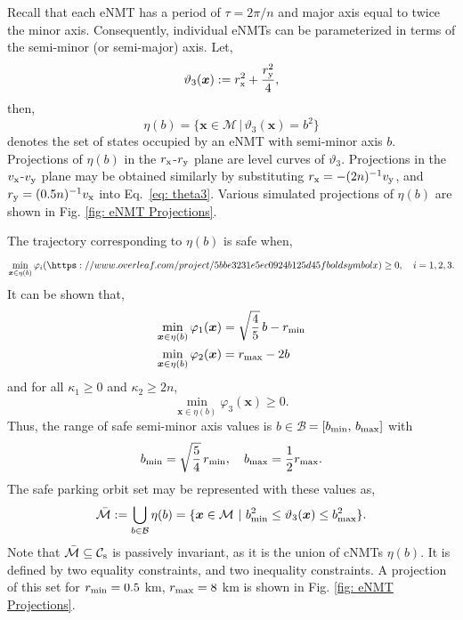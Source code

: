 \documentclass[twocolumn,letterpaper]{IEEEAerospaceCLS}  %
\theoremstyle{definition}
\begin{document}
Recall that each eNMT has a period of $\tau = 2\pi/n$ and major axis equal to twice the minor axis. 
Consequently, individual eNMTs can be parameterized in terms of the semi-minor (or semi-major) axis. 
Let, 
\begin{equation} \label{eq: theta3}
  \vartheta_3(\boldsymbol{x}) := r_{\rm x}^2 + \frac{r_{\rm y}^2}{4}, 
\end{equation}
then, 
\begin{equation}
\eta(b) = \{ \boldsymbol{x} \in {\mathcal{M}} \, | \,  \vartheta_3(\boldsymbol{x}) = b^2 \} 
\end{equation}
denotes the set of states occupied by an eNMT with semi-minor axis $b$.
Projections of $\eta(b)$ in the $r_{\rm x}$-$r_{\rm y}$ plane are level curves of $\vartheta_3$. Projections in the $v_{\rm x}$-$v_{\rm y}$ plane may be obtained similarly by substituting $r_{\rm x}=-(2n)^{-1} v_{\rm y}$, and $r_{\rm y}=(0.5n)^{-1} v_{\rm x}$ into Eq.~\eqref{eq: theta3}. 
Various simulated projections of $\eta(b)$ are shown in Fig. \ref{fig: eNMT Projections}. 

The trajectory corresponding to $\eta(b)$ is safe when, 
\begin{equation}
  \min_{\boldsymbol{x}\in\eta(b)} \varphi_i(\https://www.overleaf.com/project/5bbe3231e5ec0924b125d45fboldsymbol{x}) \geq 0, \quad i = 1,2,3. 
\end{equation}
It can be shown that, 
\begin{align}
  \min_{\boldsymbol{x}\in\eta(b)} \varphi_1(\boldsymbol{x}) &= \sqrt{\frac{4}{5}} \, b - r_{\rm min} \\ 
  \min_{\boldsymbol{x}\in\eta(b)} \varphi_2(\boldsymbol{x}) &= r_{\rm max} - 2 b \\
\end{align}
and for all $\kappa_1\geq0 $ and $\kappa_2 \geq 2n$,
\begin{equation}
   \min_{\boldsymbol{x}\in\eta(b)} \varphi_3(\boldsymbol{x}) \geq 0. 
\end{equation}
Thus, the range of safe semi-minor axis values is $b\in \mathcal{B} \,$$ = [b_{\rm min}, \, b_{\rm max}]$ with
\begin{equation}
  b_{\rm min} = \sqrt{\frac{5}{4}} \, r_{\rm min}, \quad b_{\rm max} = \frac{1}{2} r_{\rm max }.
\end{equation}
The safe parking orbit set may be represented with these values as, 
\begin{equation}
  \bar{ {\mathcal{M}} } := \bigcup_{b\in \mathcal{B}} \eta(b) = \{ \boldsymbol{x} \in {{\mathcal{M}}} \,\, | \,\,  b_{\rm min}^2 \leq \vartheta_3(\boldsymbol{x}) \leq b_{\rm max}^2 \}. 
\end{equation}
Note that $\bar{{\mathcal{M}}}\subseteq {\mathcal{C}}_{\rm s}$ is passively invariant, as it is the union of cNMTs $\eta(b)$. 
It is defined by two equality constraints, and two inequality constraints. 
A projection of this set for $r_{\rm min} = 0.5 $ km, $r_{\rm max}= 8$ km is shown in Fig. \ref{fig: eNMT Projections}. 
\end{document}
